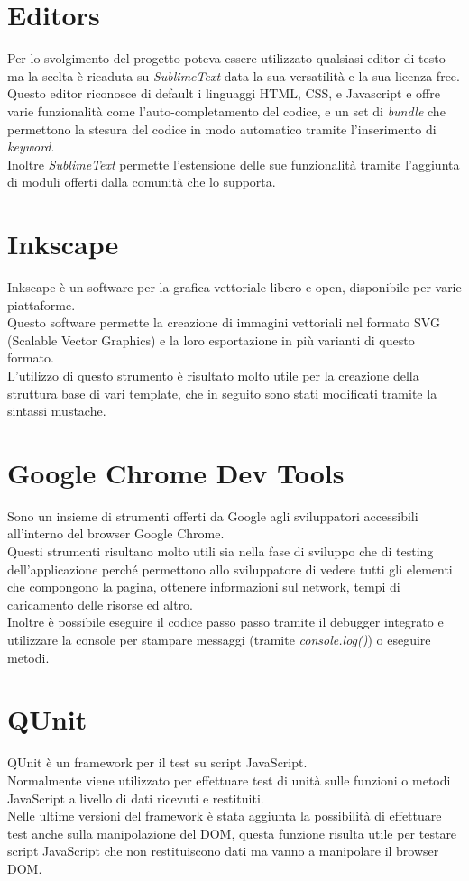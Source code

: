 \section{Editors}
Per lo svolgimento del progetto poteva essere utilizzato qualsiasi editor di testo ma la scelta è ricaduta su \textit{SublimeText} data la sua versatilità e la sua licenza free.\\
Questo editor riconosce di default i linguaggi  HTML, CSS, e Javascript e offre varie funzionalità come l'auto-completamento del codice, e un set di \textit{bundle} che permettono la stesura del codice in modo automatico tramite l'inserimento di \textit{keyword}.\\
Inoltre \textit{SublimeText} permette l'estensione delle sue funzionalità tramite l'aggiunta di moduli offerti dalla comunità che lo supporta.

\section{Inkscape}
Inkscape è un software per la grafica vettoriale libero e open, disponibile per varie piattaforme.\\
Questo software permette la creazione di immagini vettoriali nel formato SVG (Scalable Vector Graphics) e la loro esportazione in più varianti di questo formato.\\
L'utilizzo di questo strumento è risultato molto utile per la creazione della struttura base di vari template, che in seguito sono stati modificati tramite la sintassi mustache.

\section{Google Chrome Dev Tools}\label{sec:chrome}
Sono un insieme di strumenti offerti da Google agli sviluppatori accessibili all'interno del browser Google Chrome.\\
Questi strumenti risultano molto utili sia nella fase di sviluppo che di testing dell'applicazione perché permettono allo sviluppatore di vedere tutti gli elementi che compongono la pagina, ottenere informazioni sul network, tempi di caricamento delle risorse ed altro.\\
Inoltre è possibile eseguire il codice passo passo tramite il debugger integrato e utilizzare la console per stampare messaggi (tramite \textit{console.log()}) o eseguire metodi.

\section{QUnit}
QUnit è un framework per il test su script JavaScript.\\
Normalmente viene utilizzato per effettuare test di unità sulle funzioni o metodi JavaScript a livello di dati ricevuti e restituiti.\\
Nelle ultime versioni del framework è stata aggiunta la possibilità di effettuare test anche sulla manipolazione del DOM, questa funzione risulta utile per testare script JavaScript che non restituiscono dati ma vanno a manipolare il browser DOM.

